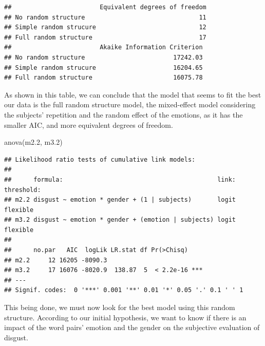 \documentclass[
]{article}
\newenvironment{Shaded}{\begin{snugshade}}{\end{snugshade}}
\newcommand{\FloatTok}[1]{\textcolor[rgb]{0.00,0.00,0.81}{#1}}
\newcommand{\FunctionTok}[1]{\textcolor[rgb]{0.00,0.00,0.00}{#1}}
\newcommand{\NormalTok}[1]{#1}
\begin{document}
\begin{verbatim}
##                        Equivalent degrees of freedom
## No random structure                               11
## Simple random strucure                            12
## Full random structure                             17
##                        Akaike Information Criterion
## No random structure                        17242.03
## Simple random strucure                     16204.65
## Full random structure                      16075.78
\end{verbatim}

As shown in this table, we can conclude that the model that seems to fit
the best our data is the full random structure model, the mixed-effect
model considering the subjects' repetition and the random effect of the
emotions, as it has the smaller AIC, and more equivalent degrees of
freedom.

\begin{Shaded}
\begin{Highlighting}[]
\FunctionTok{anova}\NormalTok{(m2}\FloatTok{.2}\NormalTok{, m3}\FloatTok{.2}\NormalTok{)}
\end{Highlighting}
\end{Shaded}

\begin{verbatim}
## Likelihood ratio tests of cumulative link models:
##  
##      formula:                                          link: threshold:
## m2.2 disgust ~ emotion * gender + (1 | subjects)       logit flexible  
## m3.2 disgust ~ emotion * gender + (emotion | subjects) logit flexible  
## 
##      no.par   AIC  logLik LR.stat df Pr(>Chisq)    
## m2.2     12 16205 -8090.3                          
## m3.2     17 16076 -8020.9  138.87  5  < 2.2e-16 ***
## ---
## Signif. codes:  0 '***' 0.001 '**' 0.01 '*' 0.05 '.' 0.1 ' ' 1
\end{verbatim}

This being done, we must now look for the best model using this random
structure. According to our initial hypothesis, we want to know if there
is an impact of the word pairs' emotion and the gender on the subjective
evaluation of disgust.
\end{document}
